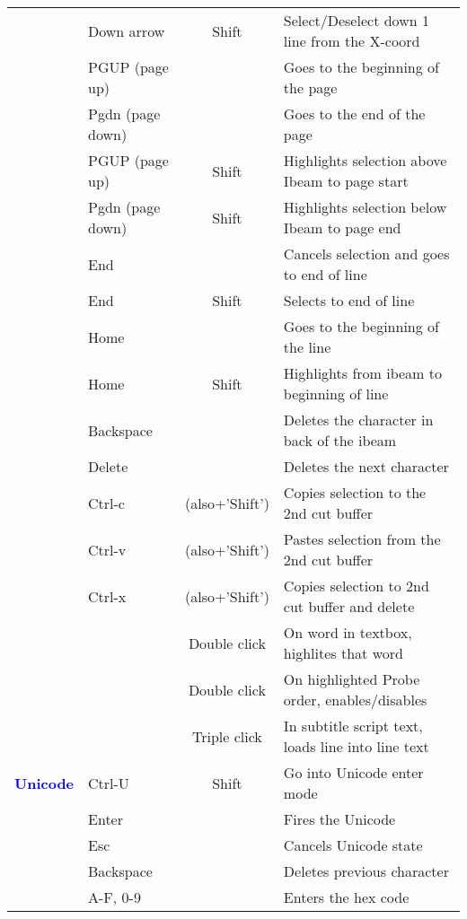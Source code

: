 \begin{center}
\begin{longtable}{ >{\bfseries}c l c p{6cm}}
        & Down arrow & Shift & Select/Deselect down 1 line from the X-coord \\        
        & PGUP (page up) &  & Goes to the beginning of the page \\        
        & Pgdn (page down) &  & Goes to the end of the page \\        
        & PGUP (page up) & Shift & Highlights selection above Ibeam to page start \\        
        & Pgdn (page down) & Shift & Highlights selection below Ibeam to page end \\        
        & End &  & Cancels selection and goes to end of line \\        
        & End & Shift & Selects to end of line \\        
        & Home &  & Goes to the beginning of the line \\        
        & Home & Shift & Highlights from ibeam to beginning of line \\        
        & Backspace &  & Deletes the character in back of the ibeam \\        
        & Delete &  & Deletes the next character \\        
        & Ctrl-c & (also+’Shift’) & Copies selection to the 2nd cut buffer \\        
        & Ctrl-v & (also+’Shift’) & Pastes selection from the 2nd cut buffer \\        
        & Ctrl-x & (also+’Shift’) & Copies selection to 2nd cut buffer and delete \\        
        &  & Double click & On word in textbox, highlites that word \\        
        &  & Double click & On highlighted Probe order, enables/disables \\        
        &  & Triple click & In subtitle script text, loads line into line text \\
        \midrule
        \textcolor{blue}{Unicode} & Ctrl-U & Shift & Go into Unicode enter mode \\        
        & Enter &  & Fires the Unicode \\        
        & Esc &  & Cancels Unicode state \\        
        & Backspace &  & Deletes previous character \\        
        & A-F, 0-9 &  & Enters the hex code \\        
        
        \bottomrule  
    \end{longtable}
\end{center}


